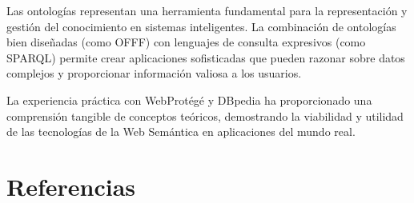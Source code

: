 \documentclass[12pt,a4paper]{article}
\begin{document}
Las ontologías representan una herramienta fundamental para la representación y gestión del conocimiento en sistemas inteligentes. La combinación de ontologías bien diseñadas (como OFFF) con lenguajes de consulta expresivos (como SPARQL) permite crear aplicaciones sofisticadas que pueden razonar sobre datos complejos y proporcionar información valiosa a los usuarios.

La experiencia práctica con WebProtégé y DBpedia ha proporcionado una comprensión tangible de conceptos teóricos, demostrando la viabilidad y utilidad de las tecnologías de la Web Semántica en aplicaciones del mundo real.

\section{Referencias}
\end{document}
